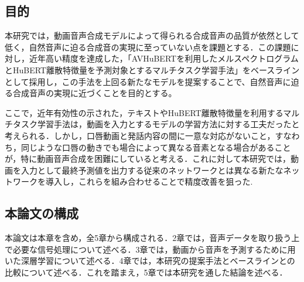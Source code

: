 \subsection{目的}
本研究では，動画音声合成モデルによって得られる合成音声の品質が依然として低く，自然音声に迫る合成音の実現に至っていない点を課題とする．この課題に対し，近年高い精度を達成した，「AVHuBERTを利用したメルスペクトログラムとHuBERT離散特徴量を予測対象とするマルチタスク学習手法」をベースラインとして採用し，この手法を上回る新たなモデルを提案することで、自然音声に迫る合成音声の実現に近づくことを目的とする。

ここで，近年有効性の示された，テキストやHuBERT離散特徴量を利用するマルチタスク学習手法は，動画を入力とするモデルの学習方法に対する工夫だったと考えられる．しかし，口唇動画と発話内容の間に一意な対応がないこと，すなわち，同じような口唇の動きでも場合によって異なる音素となる場合があることが，特に動画音声合成を困難にしていると考える．これに対して本研究では，動画を入力として最終予測値を出力する従来のネットワークとは異なる新たなネットワークを導入し，これらを組み合わせることで精度改善を狙った.

\subsection{本論文の構成}
本論文は本章を含め，全5章から構成される．2章では，音声データを取り扱う上で必要な信号処理について述べる．3章では，動画から音声を予測するために用いた深層学習について述べる．4章では，本研究の提案手法とベースラインとの比較について述べる．これを踏まえ，5章では本研究を通した結論を述べる．
